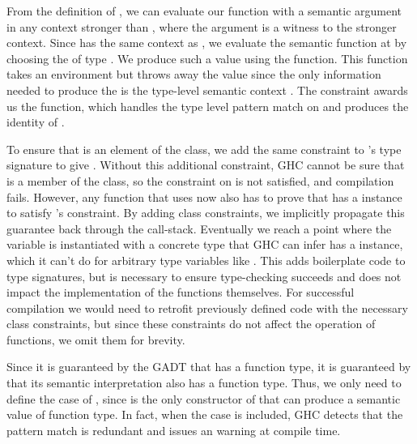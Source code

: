 From the definition of , we can evaluate our function with a semantic argument in any context stronger than , where the  argument is a witness to the stronger context.
Since  has the same context  as , we evaluate the semantic function  at  by choosing the  of type . We produce such a value using the  function. This function takes an environment but throws away the value since the only information needed to produce the  is the type-level semantic context . The  constraint awards us the  function, which handles the type level pattern match on  and produces the identity  of . 

To ensure that  is an element of the  class, we add the same constraint to 's type signature to give . 
Without this additional constraint, GHC cannot be sure that  is a member of the  class, so the constraint on  is not satisfied, and compilation fails. However, any function that uses  now also has to prove that  has a  instance to satisfy 's constraint. By adding class constraints, we implicitly propagate this guarantee back through the call-stack. Eventually we reach a point where the  variable is instantiated with a concrete type that GHC can infer has a  instance, which it can't do for arbitrary type variables like . This adds boilerplate code to type signatures, but is necessary to ensure type-checking succeeds and does not impact the implementation of the functions themselves. For successful compilation we would need to retrofit previously defined code with the necessary class constraints, but since these constraints do not affect the operation of functions, we omit them for brevity.


Since it is guaranteed by the  GADT that  has a function type, it is guaranteed by  that its semantic interpretation  also has a function type. Thus, we only need to define the  case of , since  is the only constructor of  that can produce a semantic value of function type. In fact, when the  case is included, GHC detects that the pattern match is redundant and issues an  warning at compile time. 


